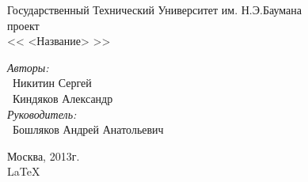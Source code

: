 \documentclass{article}
\begin{document}
\begin{titlepage}
\begin{center}
{ Государственный Технический Университет им. Н.Э.Баумана}
\\[50mm]
{ проект}
\\[7mm]
{\LARGE << <Название> >>}
\\[37mm]

\begin{flushright}
    \begin{minipage}{0.5\textwidth}
        \begin{flushleft}
            \textit{Авторы:} \\ 
            ~Никитин Сергей \\
            ~Киндяков Александр \\[10mm]
            \textit{Руководитель:} \\
            ~Бошляков Андрей Анатольевич
        \end{flushleft}
    \end{minipage}
\end{flushright}

\vfill %
Москва, 2013г. \\
\LaTeX
\end{center}
\end{titlepage}

\tableofcontents
\newpage







\end{document}
